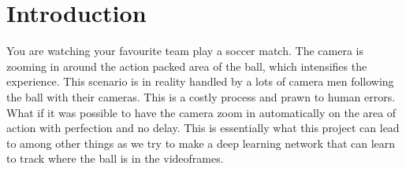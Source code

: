 
\section{Introduction}
You are watching your favourite team play a soccer match. The camera is zooming in around the action packed area of the ball, which intensifies the experience.
This scenario is in reality handled by a lots of camera men following the ball with their cameras. This is a costly process and prawn to human errors. What if it was possible to have the camera zoom in automatically on the area of action with perfection and no delay. This is essentially what this project can lead to among other things as we try to make a deep learning network that can learn to track where the ball is in the videoframes.

\cite{inception}
\cite{NIPS_article}

